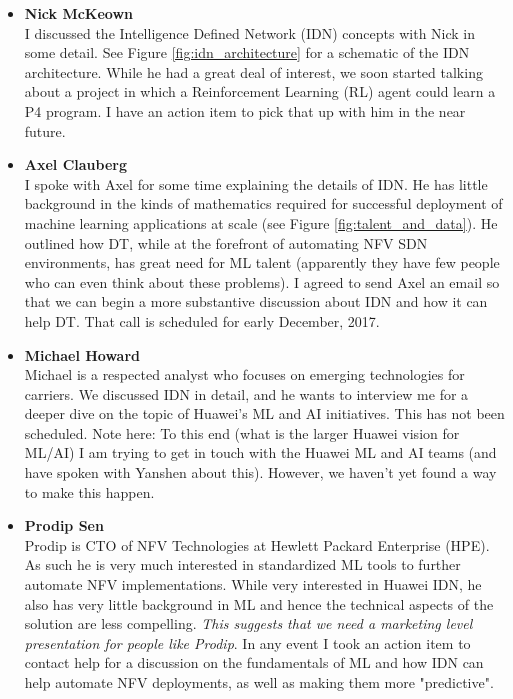 \documentclass[11pt, oneside]{article}   	%
\begin{document}
\begin{itemize}
\item \textbf{Nick McKeown} \\
I discussed the Intelligence Defined Network (IDN) concepts with Nick in some detail. See Figure \ref{fig:idn_architecture} for a schematic of the IDN architecture. While he had a great deal of interest, we soon started talking about a project in which a Reinforcement Learning (RL) agent could learn a P4 program. I have an action item to pick that up with him in the near future.

\item \textbf{Axel  Clauberg} \\
I spoke with Axel for some time explaining the details of IDN. He has little background in the kinds of mathematics required for successful deployment of machine learning applications at scale (see Figure \ref{fig:talent_and_data}). He outlined how DT, while at the forefront of automating NFV SDN environments, has great need for ML talent (apparently they have few people who can even think about these problems). I agreed to send Axel an email so that we can begin a more substantive discussion about IDN and how it can help DT. That call is scheduled for early December, 2017.


\item \textbf{Michael Howard} \\
Michael is a respected analyst who focuses on emerging technologies for carriers. We discussed IDN in detail, and he wants to interview me for a deeper dive on the topic of Huawei's ML and AI initiatives. This has not been scheduled. Note here: To this end (what is the larger Huawei vision for ML/AI) I am trying to get in touch with the Huawei ML and AI teams (and have spoken with Yanshen about this). However, we haven't yet found a way to make this happen.

\item \textbf{Prodip Sen} \\
Prodip is CTO of NFV Technologies at Hewlett Packard Enterprise (HPE). As such he is very much interested in standardized ML tools to further automate NFV implementations. While very interested in Huawei IDN, he also has very little background in ML and hence the technical aspects of the solution are less compelling. \emph{This suggests that we need a marketing level presentation for people like Prodip}. In any event I took an action item to contact help for a discussion on the fundamentals of ML and how IDN can help automate NFV deployments, as well as making them more "predictive".


\end{itemize}
\end{document}
